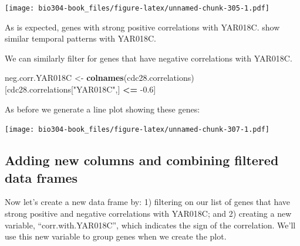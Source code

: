 \documentclass[]{book}
\newenvironment{Shaded}{\begin{snugshade}}{\end{snugshade}}
\newcommand{\DataTypeTok}[1]{\textcolor[rgb]{0.13,0.29,0.53}{#1}}
\newcommand{\FloatTok}[1]{\textcolor[rgb]{0.00,0.00,0.81}{#1}}
\newcommand{\KeywordTok}[1]{\textcolor[rgb]{0.13,0.29,0.53}{\textbf{#1}}}
\newcommand{\NormalTok}[1]{#1}
\newcommand{\OperatorTok}[1]{\textcolor[rgb]{0.81,0.36,0.00}{\textbf{#1}}}
\newcommand{\StringTok}[1]{\textcolor[rgb]{0.31,0.60,0.02}{#1}}
\theoremstyle{definition}
\theoremstyle{definition}
\theoremstyle{definition}
\theoremstyle{remark}
\begin{document}
\texttt{[image: bio304-book\_files/figure-latex/unnamed-chunk-305-1.pdf]}

As is expected, genes with strong positive correlations with YAR018C.
show similar temporal patterns with YAR018C.

We can similarly filter for genes that have negative correlations with
YAR018C.

\begin{Shaded}
\begin{Highlighting}[]
\NormalTok{neg.corr.YAR018C <-}\StringTok{ }\KeywordTok{colnames}\NormalTok{(cdc28.correlations)[cdc28.correlations[}\StringTok{"YAR018C"}\NormalTok{,] }\OperatorTok{<=}\StringTok{ }\FloatTok{-0.6}\NormalTok{]}
\end{Highlighting}
\end{Shaded}

As before we generate a line plot showing these genes:

\begin{Shaded}
\end{Shaded}

\texttt{[image: bio304-book\_files/figure-latex/unnamed-chunk-307-1.pdf]}

\hypertarget{adding-new-columns-and-combining-filtered-data-frames}{%
\subsection{Adding new columns and combining filtered data
frames}\label{adding-new-columns-and-combining-filtered-data-frames}}

Now let's create a new data frame by: 1) filtering on our list of genes
that have strong positive and negative correlations with YAR018C; and 2)
creating a new variable, ``corr.with.YAR018C'', which indicates the sign
of the correlation. We'll use this new variable to group genes when we
create the plot.
\end{document}
